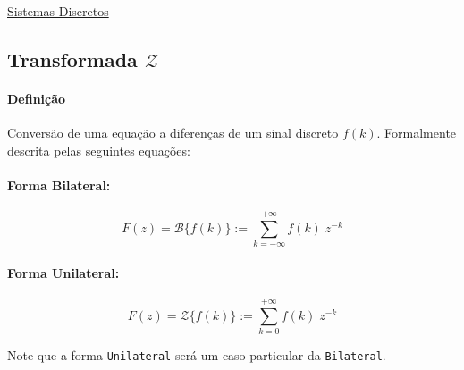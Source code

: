 \documentclass{article}
\begin{document}
\href{https://www.mathworks.com/matlabcentral/answers/55210-discrete-system-solving-with-matlab}{Sistemas Discretos}

\newpage
\subsection{Transformada $\mathcal{Z}$}
    \paragraph{Definição}Conversão de uma equação a diferenças de um sinal discreto $f(k)$. \href{https://en.wikipedia.org/wiki/Z-transform}{Formalmente} descrita pelas seguintes equações:
    \begin{multicols}{2}
        \raggedcolumns
        \paragraph{Forma Bilateral:}
        \begin{equation}
            \boxed{
                F(z) = \mathcal{B} \{ f(k) \} := \sum_{k=-\infty}^{+\infty} f(k) \; z^{-k}
            }
        \end{equation}
        \columnbreak
        \paragraph{Forma Unilateral:}
        \begin{equation}
            \boxed{
                F(z) = \mathcal{Z}\{ f(k) \} := \sum_{k=0}^{+\infty} f(k) \; z^{-k}
            }
        \end{equation}
    \end{multicols}\noindent
    Note que a forma \texttt{Unilateral} será um caso particular da \texttt{Bilateral}.
\end{document}

